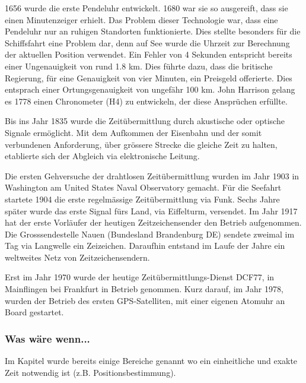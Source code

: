 1656 wurde die erste Pendeluhr entwickelt. 1680 war sie so ausgereift, dass sie einen Minutenzeiger erhielt. Das Problem dieser Technologie war, dass eine Pendeluhr nur an ruhigen Standorten funktionierte.
Dies stellte besonders für die Schiffsfahrt eine Problem dar, denn auf See wurde die Uhrzeit zur Berechnung der aktuellen Position verwendet.
Ein Fehler von 4 Sekunden entspricht bereits einer Ungenauigkeit  von rund 1.8 km.
Dies führte dazu, dass die britische Regierung, für eine Genauigkeit von vier Minuten, ein Preisgeld offerierte. Dies entsprach einer Ortungsgenauigkeit von ungefähr 100 km.
John Harrison gelang es 1778 einen Chronometer (H4) zu entwickeln, der diese Ansprüchen erfüllte.

Bis ins Jahr 1835 wurde die Zeitübermittlung durch akustische oder optische Signale ermöglicht.
Mit dem Aufkommen der Eisenbahn und der somit verbundenen Anforderung, über grössere Strecke die gleiche Zeit zu halten, etablierte sich der Abgleich via elektronische Leitung.

Die ersten Gehversuche der drahtlosen Zeitübermittlung wurden im Jahr 1903 in Washington am United States Naval Observatory gemacht.
Für die Seefahrt startete 1904 die erste regelmässige Zeitübermittlung via Funk. Sechs Jahre später wurde das erste Signal fürs Land, via Eiffelturm, versendet. Im Jahr 1917 hat der erste Vorläufer der heutigen Zeitzeichensender den Betrieb aufgenommen. Die Grosssendestelle Nauen (Bundesland Brandenburg DE) sendete zweimal im Tag via Langwelle ein Zeizeichen. Daraufhin entstand im Laufe der Jahre ein weltweites Netz von Zeitzeichensendern.

Erst im Jahr 1970 wurde der heutige Zeitübermittlungs-Dienst DCF77, in Mainflingen bei Frankfurt in Betrieb genommen.
Kurz darauf, im Jahr 1978, wurden der Betrieb des ersten GPS-Satelliten, mit einer eigenen Atomuhr an Board gestartet.


\subsubsection{Was wäre wenn...}
Im Kapitel  wurde bereits einige Bereiche genannt wo ein einheitliche und exakte Zeit notwendig ist (z.B. Positionsbestimmung).

